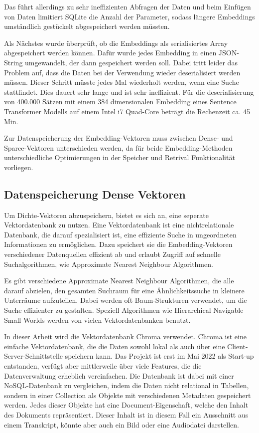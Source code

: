 Das führt allerdings zu sehr ineffizienten Abfragen der Daten und beim Einfügen von Daten limitiert SQLite die Anzahl der Parameter, sodass längere Embeddings umständlich gestückelt abgespeichert werden müssten.

Als Nächstes wurde überprüft, ob die Embeddings als serialisiertes Array abgespeichert werden können.
Dafür wurde jedes Embedding in einen JSON-String umgewandelt, der dann gespeichert werden soll. 
Dabei tritt leider das Problem auf, dass die Daten bei der Verwendung wieder deserialisiert werden müssen.
Dieser Schritt müsste jedes Mal wiederholt werden, wenn eine Suche stattfindet. 
Dies dauert sehr lange und ist sehr ineffizient. 
Für die deserialisierung von 400.000 Sätzen mit einem 384 dimensionalen Embedding eines Sentence Transformer Modells auf einem Intel i7 Quad-Core beträgt die Rechenzeit ca. 45 Min.

Zur Datenspeicherung der Embedding-Vektoren muss zwischen Dense- und Sparce-Vektoren unterschieden werden, da für beide Embedding-Methoden unterschiedliche Optimierungen in der Speicher und Retrival Funktionalität vorliegen. 

\subsection{Datenspeicherung Dense Vektoren}

Um Dichte-Vektoren abzuspeichern, bietet es sich an, eine seperate Vektordatenbank zu nutzen.
Eine Vektordatenbank ist eine nichtrelationale Datenbank, die darauf spezialisiert ist, eine effiziente Suche in ungeordneten Informationen zu ermöglichen.
Dazu speichert sie die Embedding-Vektoren verschiedener Datenquellen effizient ab und erlaubt Zugriff auf schnelle Suchalgorithmen, wie Approximate Nearest Neighbour Algorithmen.

Es gibt verschiedene Approximate Nearest Neighbour Algorithmen, die alle darauf abzielen, den gesamten Suchraum für eine Ähnlichkeitssuche in kleinere Unterräume aufzuteilen.
Dabei werden oft Baum-Strukturen verwendet, um die Suche effizienter zu gestalten.
Speziell Algorithmen wie Hierarchical Navigable Small Worlds werden von vielen Vektordatenbanken benutzt.

In dieser Arbeit wird die Vektordatenbank Chroma verwendet. 
Chroma ist eine einfache Vektordatenbank, die die Daten sowohl lokal als auch über eine Client-Server-Schnittstelle speichern kann.
Das Projekt ist erst im Mai 2022 als Start-up entstanden, verfügt aber mittlerweile über viele Features, die die Datenverwaltung erheblich vereinfachen.
Die Datenbank ist dabei mit einer NoSQL-Datenbank zu vergleichen, indem die Daten nicht relational in Tabellen, sondern in einer Collection als Objekte mit verschiedenen Metadaten gespeichert werden.
Jedes dieser Objekte hat eine Document-Eigenschaft, welche den Inhalt des Dokuments repräsentiert.
Dieser Inhalt ist in diesem Fall ein Ausschnitt aus einem Transkript, könnte aber auch ein Bild oder eine Audiodatei darstellen.

